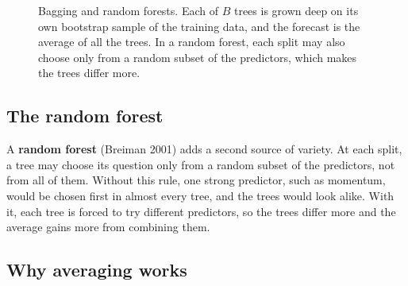 \begin{figure}[htbp]
  \centering
  \caption{Bagging and random forests. Each of $B$ trees is grown deep on its own
    bootstrap sample of the training data, and the forecast is the average of
    all the trees. In a random forest, each split may also choose only from a
    random subset of the predictors, which makes the trees differ more.}
  \label{fig:21-ensembles}
\end{figure}

\subsection{The random forest}

A \textbf{random forest} (Breiman 2001) adds a second source of variety. At each split, a tree may choose its question only from a random subset of the predictors, not from all of them. Without this rule, one strong predictor, such as momentum, would be chosen first in almost every tree, and the trees would look alike. With it, each tree is forced to try different predictors, so the trees differ more and the average gains more from combining them.

\subsection{Why averaging works}


